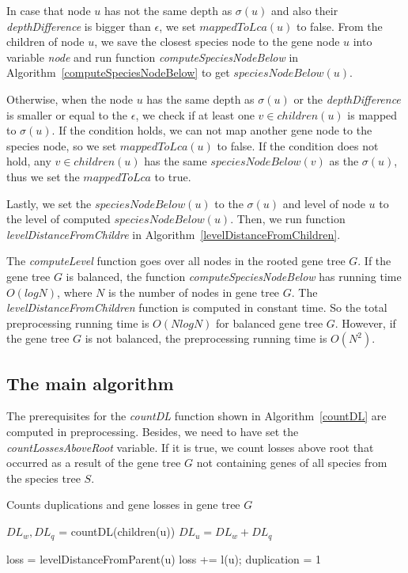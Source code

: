 In case that node $u$ has not the same depth as $\sigma(u)$ and also their \emph{depthDifference} is bigger than $\epsilon$, we set $mappedToLca(u)$ to false. From the children of node $u$, we save the closest species node to the gene node $u$ into variable \emph{node} and run function \emph{computeSpeciesNodeBelow} in Algorithm~\ref{computeSpeciesNodeBelow} to get $speciesNodeBelow(u)$. 

Otherwise, when the node $u$ has the same depth as $\sigma(u)$ or the \emph{depthDifference} is smaller or equal to the $\epsilon$, we check if at least one $v \in children(u)$ is mapped to $\sigma(u)$. If the condition holds, we can not map another gene node to the species node, so we set $mappedToLca(u)$ to false. If the condition does not hold, any $v \in children (u)$ has the same $speciesNodeBelow(v)$ as the $\sigma(u)$, thus we set the $mappedToLca$ to true.

Lastly, we set the $speciesNodeBelow(u)$ to the $\sigma(u)$ and level of node $u$ to the level of computed $speciesNodeBelow(u)$. Then, we run function \emph{levelDistanceFromChildre} in Algorithm~\ref{levelDistanceFromChildren}.

The \emph{computeLevel} function goes over all nodes in the rooted gene tree $G$. If the gene tree $G$ is balanced, the function \emph{computeSpeciesNodeBelow} has running time $O(log N)$, where $N$ is the number of nodes in gene tree $G$. The \emph{levelDistanceFromChildren} function is computed in constant time. So the total preprocessing running time is $O(N log N)$ for balanced gene tree $G$. However, if the gene tree $G$ is not balanced, the preprocessing running time is $O(N^2)$.

\subsection{The main algorithm} \label{main_algorithm}

The prerequisites for the \emph{countDL} function shown in Algorithm~\ref{countDL} are computed in preprocessing. Besides, we need to have set the \emph{countLossesAboveRoot} variable. If it is true, we count losses above root that occurred as a result of the gene tree $G$ not containing genes of all species from the species tree $S$.

\begin{algorithm}[!htbp]
\caption{Counts duplications and gene losses in gene tree $G$} 
\label{countDL}
\begin{algorithmic}[1]
		\State $DL_w, DL_q$ = countDL(children(u))
		\State $DL_u = DL_w+DL_q$
	\EndIf

	\State loss = levelDistanceFromParent(u)
		\State loss += l(u); 
	\EndIf
		\State duplication = 1
	\EndIf
	
\EndFunction
\end{algorithmic}
\end{algorithm}

